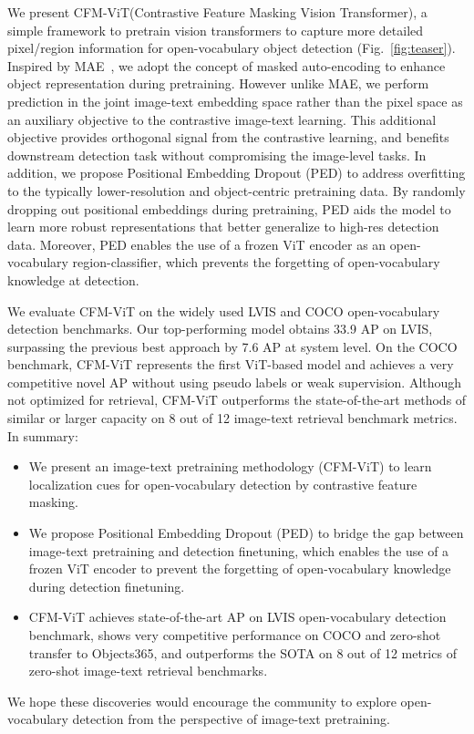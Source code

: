 \documentclass[10pt,twocolumn,letterpaper]{article}
\newcommand{\figref}[1]{Fig.~\ref{#1}}
\newcommand{\ours}{CFM-ViT\xspace}
\begin{document}
We present \ours (Contrastive Feature Masking Vision Transformer), a simple framework to pretrain vision transformers to capture more detailed pixel/region information for open-vocabulary object detection (\figref{fig:teaser}). Inspired by MAE~\cite{He_2022_CVPR}, we adopt the concept of masked auto-encoding to enhance object representation during pretraining. However unlike MAE, we perform prediction in the joint image-text embedding space rather than the pixel space as an auxiliary objective to the contrastive image-text learning. This additional objective provides orthogonal signal from the contrastive learning, and benefits downstream detection task without compromising the image-level tasks. In addition, we propose Positional Embedding Dropout (PED) to address overfitting to the typically lower-resolution and object-centric pretraining data. By randomly dropping out positional embeddings during pretraining, PED aids the model to learn more robust representations that better generalize to high-res detection data. Moreover, PED enables the use of a frozen ViT encoder as an open-vocabulary region-classifier, which prevents the forgetting of open-vocabulary knowledge at detection.

We evaluate \ours on the widely used LVIS and COCO open-vocabulary detection benchmarks. Our top-performing model obtains 33.9 AP on LVIS, surpassing the previous best approach by 7.6 AP at system level. 
On the COCO benchmark, \ours represents the first ViT-based model and achieves a very competitive novel AP without using pseudo labels or weak supervision. 
Although not optimized for retrieval, \ours outperforms the state-of-the-art methods of similar or larger capacity on 8 out of 12 image-text retrieval benchmark metrics. 
In summary:
\begin{itemize}
    \item We present an image-text pretraining methodology (\ours) to learn localization cues for open-vocabulary detection by contrastive feature masking.
    \item We propose Positional Embedding Dropout (PED) to bridge the gap between image-text pretraining and detection finetuning, which enables the use of a frozen ViT encoder to prevent the forgetting of open-vocabulary knowledge during detection finetuning.
    \item \ours achieves state-of-the-art AP on LVIS open-vocabulary detection benchmark, shows very competitive performance on COCO and zero-shot transfer to Objects365, and outperforms the SOTA on 8 out of 12 metrics of zero-shot image-text retrieval benchmarks.
\end{itemize}
We hope these discoveries would encourage the community to explore open-vocabulary detection from the perspective of image-text pretraining.
\end{document}
